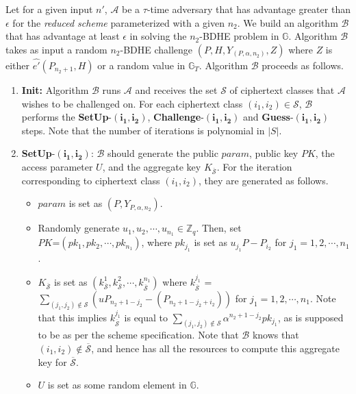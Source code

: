 \textbf{} Let for a given input $n'$, $\mathcal{A}$ be a $\tau$-time adversary that has advantage greater than $\epsilon$ for the \emph{reduced scheme} parameterized with a given $n_2$. We build an algorithm $\mathcal{B}$ that has advantage at least $\epsilon$ in solving the $n_2$-BDHE problem in $\mathbb{G}$. Algorithm $\mathcal{B}$ takes as input a random $n_2$-BDHE challenge $(P,H,Y_{(P,\alpha,n_2)},Z)$ where $Z$ is either $\hat{e'}(P_{n_2+1},H)$ or a random value in $\mathbb{G}_T$. Algorithm $\mathcal{B}$ proceeds as follows.

\begin{enumerate}
 \item \textbf{Init:} Algorithm $\mathcal{B}$ runs $\mathcal{A}$ and receives the set $\mathcal{S}$ of ciphertext classes that $\mathcal{A}$ wishes to be challenged on. For each ciphertext class $(i_1,i_2)\in\mathcal{S}$, $\mathcal{B}$ performs the \textbf{SetUp}-$\mathbf{(i_1,i_2)}$, \textbf{Challenge}-$\mathbf{(i_1,i_2)}$ and \textbf{Guess}-$\mathbf{(i_1,i_2)}$ steps. Note that the number of iterations is polynomial in $|S|$. 
 
 \item \textbf{SetUp}-$\mathbf{(i_1,i_2)}$: $\mathcal{B}$ should generate the public $param$, public key $PK$, the access parameter $U$, and the aggregate key $K_{\overline{\mathcal{S}}}$. For the iteration corresponding to ciphertext class $(i_1,i_2)$, they are generated as follows.
 \begin{itemize}
  \item $param$ is set as $(P,Y_{P,\alpha,n_2})$.
  \item Randomly generate $u_1,u_2,\cdots,u_{n_1} \in \mathbb{Z}_q$. Then, set\\ $PK$=$(pk_1,pk_2,\cdots,pk_{n_1})$, where $pk_{j_1}$ is set as $u_{j_1}P - P_{i_2}$ for $j_1=1,2,\cdots,n_1$.
  \item $K_{\overline{\mathcal{S}}}$ is set as $(k^{1}_{\overline{\mathcal{S}}},k^{2}_{\overline{\mathcal{S}}},\cdots,k^{n_1}_{\overline{\mathcal{S}}})$ where $k^{j_1}_{\overline{\mathcal{S}}}$ = $\sum_{(j_1,j_2)\notin\mathcal{S}}({u}P_{n_2+1-j_2}-(P_{n_2+1-j_2+i_2}))$ for $j_1=1,2,\cdots,n_1$. Note that this implies $k^{j_1}_{\overline{\mathcal{S}}}$ is equal to $\sum_{(j_1,j_2)\notin\mathcal{S}}\alpha^{n_2+1-j_2}pk_{j_1}$, as is supposed to be as per the scheme specification. Note that $\mathcal{B}$ knows that $(i_1,i_2)\notin \overline{\mathcal{S}}$, and hence has all the resources to compute this aggregate key for $\overline{\mathcal{S}}$. 
  \item $U$ is set as some random element in $\mathbb{G}$.
 \end{itemize}
 

\end{enumerate}
